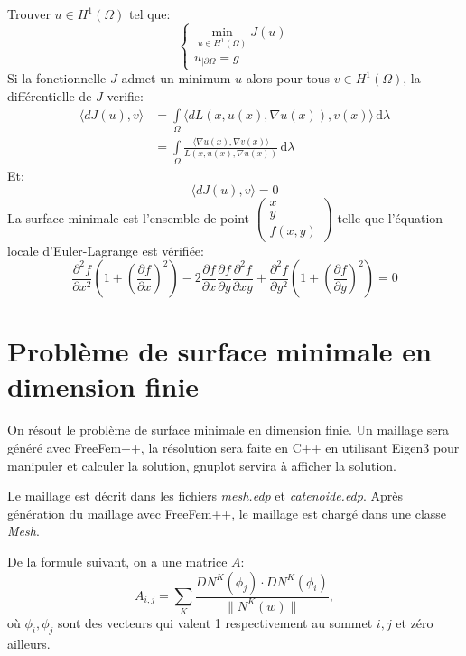 \documentclass[a4paper, 11pt]{article}
\begin{document}
Trouver $u\in H^1(\Omega)$ tel que:
\begin{equation}
\begin{cases}
\min\limits_{u\in H^1(\Omega)}J(u) \\
u_{|\partial\Omega}=g
\end{cases}
\end{equation}
Si la fonctionnelle $J$ admet un minimum $u$ alors pour tous $v\in H^1(\Omega)$,
 la diff\'erentielle de $J$ verifie:
\begin{align*}
\langle dJ(u), v\rangle &= \int\limits_\Omega\langle dL(x, u(x), \nabla u(x)),
v(x)\rangle\,\mathrm{d}\lambda \\
&= \int\limits_\Omega\frac{\langle \nabla u(x), \nabla v(x)\rangle}{L(x, u(x),
 \nabla u(x))}\,\mathrm{d}\lambda
\end{align*}
Et:
$$
\langle dJ(u), v\rangle = 0
$$
La surface minimale est l'ensemble de point
 $\begin{pmatrix}x \\ y \\ f(x, y)\end{pmatrix}$ telle que l'\'equation locale
 d'Euler-Lagrange est v\'erifi\'ee: \\
\begin{equation}
\frac{\partial^2f}{\partial x^2}\left(1+\left(\frac{\partial f}{\partial x}\right)^2\right)-2\frac{\partial f}{\partial x}\frac{\partial f}{\partial y}\frac{\partial^2f}{\partial xy}+\frac{\partial^2f}{\partial y^2}\left(1+\left(\frac{\partial f}{\partial y}\right)^2\right) = 0
\end{equation}
\newpage
\section{Probl\`eme de surface minimale en dimension finie}
On r\'esout le probl\`eme de surface minimale en dimension finie. Un maillage
 sera g\'en\'er\'e avec FreeFem++, la r\'esolution sera faite en C++ en
 utilisant Eigen3 pour manipuler et calculer la solution, gnuplot servira \`a
 afficher la solution.

Le maillage est d\'ecrit dans les fichiers \textit{mesh.edp} et
 \textit{catenoide.edp}. Apr\`es g\'en\'eration du maillage avec FreeFem++,
 le maillage est charg\'e dans une classe \textit{Mesh}.

De la formule suivant, on a une matrice $A$:
$$
A_{i,j}=\sum\limits_{K}\frac{DN^K(\phi_j)\cdot DN^K(\phi_i)}{\|N^K(w)\|},
$$
 o\`u $\phi_i, \phi_j$ sont des vecteurs qui valent 1 respectivement au sommet
 $i,j$ et z\'ero ailleurs.
\end{document}
